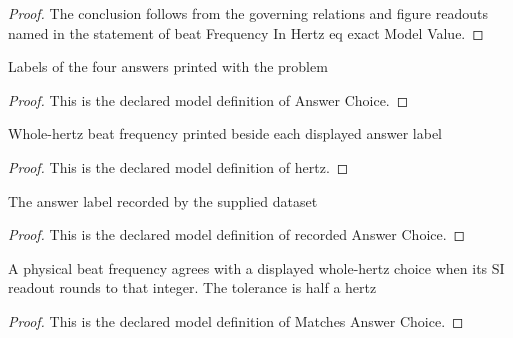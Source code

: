 \begin{proof}
  The conclusion follows from the governing relations and figure readouts named in the statement of beat Frequency In Hertz eq exact Model Value.
\end{proof}
\begin{definition}
  \label{def:physics:phyx-mini-0222:phyxminiproblems-problemphyxmini0222-answerchoice}
  Labels of the four answers printed with the problem
\end{definition}
\begin{proof}
  This is the declared model definition of Answer Choice.
\end{proof}
\begin{definition}[hertz]
  \label{def:physics:phyx-mini-0222:phyxminiproblems-problemphyxmini0222-answerchoice-hertz}
  Whole-hertz beat frequency printed beside each displayed answer label
\end{definition}
\begin{proof}
  This is the declared model definition of hertz.
\end{proof}
\begin{definition}
  \label{def:physics:phyx-mini-0222:phyxminiproblems-problemphyxmini0222-recordedanswerchoice}
  The answer label recorded by the supplied dataset
\end{definition}
\begin{proof}
  This is the declared model definition of recorded Answer Choice.
\end{proof}
\begin{definition}
  \label{def:physics:phyx-mini-0222:phyxminiproblems-problemphyxmini0222-matchesanswerchoice}
  A physical beat frequency agrees with a displayed whole-hertz choice when its SI readout rounds to that integer. The tolerance is half a hertz
\end{definition}
\begin{proof}
  This is the declared model definition of Matches Answer Choice.
\end{proof}
